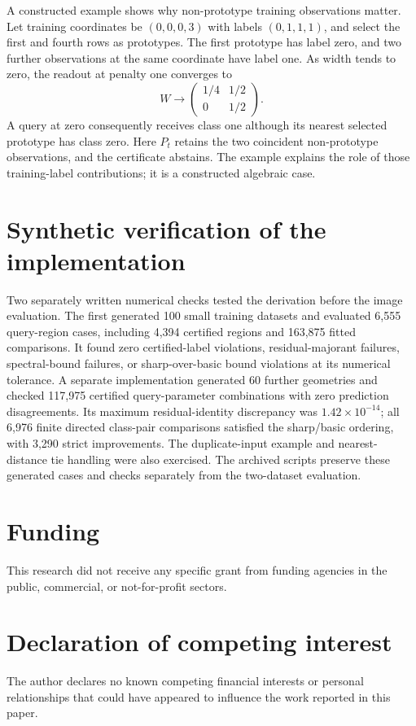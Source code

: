 \documentclass[preprint,12pt]{elsarticle}
\begin{document}
A constructed example shows why non-prototype training observations matter. Let training coordinates be $(0,0,0,3)$ with labels $(0,1,1,1)$, and select the first and fourth rows as prototypes. The first prototype has label zero, and two further observations at the same coordinate have label one. As width tends to zero, the readout at penalty one converges to
\[
 W\longrightarrow
 \begin{pmatrix}1/4&1/2\\0&1/2\end{pmatrix}.
\]
A query at zero consequently receives class one although its nearest selected prototype has class zero. Here $P_t$ retains the two coincident non-prototype observations, and the certificate abstains. The example explains the role of those training-label contributions; it is a constructed algebraic case.

\section{Synthetic verification of the implementation}
Two separately written numerical checks tested the derivation before the image evaluation. The first generated 100 small training datasets and evaluated 6,555 query-region cases, including 4,394 certified regions and 163,875 fitted comparisons. It found zero certified-label violations, residual-majorant failures, spectral-bound failures, or sharp-over-basic bound violations at its numerical tolerance. A separate implementation generated 60 further geometries and checked 117,975 certified query-parameter combinations with zero prediction disagreements. Its maximum residual-identity discrepancy was $1.42\times10^{-14}$; all 6,976 finite directed class-pair comparisons satisfied the sharp/basic ordering, with 3,290 strict improvements. The duplicate-input example and nearest-distance tie handling were also exercised. The archived scripts preserve these generated cases and checks separately from the two-dataset evaluation.

\section*{Funding}
This research did not receive any specific grant from funding agencies in the public, commercial, or not-for-profit sectors.

\section*{Declaration of competing interest}
The author declares no known competing financial interests or personal relationships that could have appeared to influence the work reported in this paper.
\end{document}
